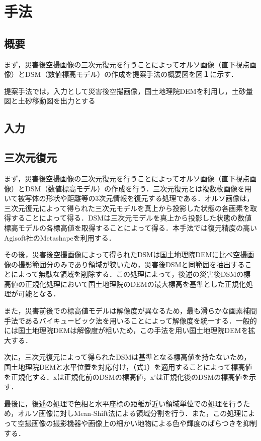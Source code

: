\chapter{手法}
  \section{概要}
    まず，災害後空撮画像の三次元復元を行うことによってオルソ画像（直下視点画像）とDSM（数値標高モデル）の作成を提案手法の概要図を図１に示す．
  
  提案手法では，入力として災害後空撮画像，国土地理院DEMを利用し，土砂量図と土砂移動図を出力とする

  
  \section{入力}



  \section{三次元復元}
    まず，災害後空撮画像の三次元復元を行うことによってオルソ画像（直下視点画像）とDSM（数値標高モデル）の作成を行う．三次元復元とは複数枚画像を用いて被写体の形状や距離等の3次元情報を復元する処理である．オルソ画像は，三次元復元によって得られた三次元モデルを真上から投影した状態の各画素を取得することによって得る．DSMは三次元モデルを真上から投影した状態の数値標高モデルの各標高値を取得することによって得る．本手法では復元精度の高いAgisoft社のMetashape\cite{使用手法1}を利用する．

    その後，災害後空撮画像によって得られたDSMは国土地理院DEMに比べ空撮画像の撮影範囲分のみであり領域が狭いため，災害後DSMと同範囲を抽出することによって無駄な領域を削除する．この処理によって，後述の災害後DSMの標高値の正規化処理において国土地理院のDEMの最大標高を基準とした正規化処理が可能となる．
  
    また，災害前後での標高値モデルは解像度が異なるため，最も滑らかな画素補間手法であるバイキュービック法\cite{論文手法1}を用いることによって解像度を統一する．一般的には国土地理院DEMは解像度が粗いため，この手法を用い国土地理院DEMを拡大する．
    
    次に，三次元復元によって得られたDSMは基準となる標高値を持たないため，国土地理院DEMと水平位置を対応付け，（式1）を適用することによって標高値を正規化する．xは正規化前のDSMの標高値，x’は正規化後のDSMの標高値を示す．
    
    最後に，後述の処理で色相と水平座標の距離が近い領域単位での処理を行うため，オルソ画像に対しMean-Shift法\cite{論文手法2}による領域分割を行う．また，この処理によって空撮画像の撮影機器や画像上の細かい地物による色や輝度のばらつきを抑制する．


